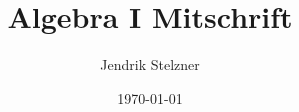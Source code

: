 \documentclass[a4paper,10pt]{book}
\begin{document}
\title{\sc Algebra I Mitschrift}
\author{Jendrik Stelzner}
\date{\today}

\frontmatter
\maketitle

\tableofcontents


\mainmatter

\end{document}
